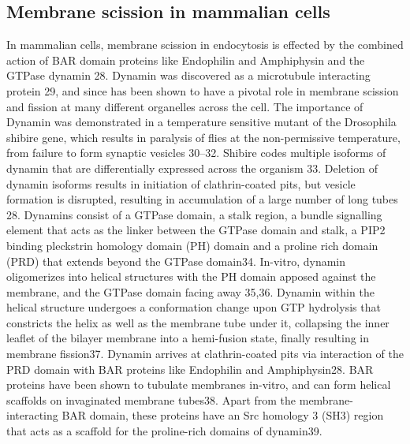 	\subsection{Membrane scission in mammalian cells}
In mammalian cells, membrane scission in endocytosis is effected by the combined action of BAR domain proteins like Endophilin and Amphiphysin and the GTPase dynamin 28.  Dynamin was discovered as a microtubule interacting protein 29, and since has been shown to have a pivotal role in membrane scission and fission at many different organelles across the cell. The importance of Dynamin was demonstrated in a temperature sensitive mutant of the Drosophila shibire gene, which results in paralysis of flies at the non-permissive temperature, from failure to form synaptic vesicles 30–32. Shibire codes multiple isoforms of dynamin that are differentially expressed across the organism 33. Deletion of dynamin isoforms results in initiation of clathrin-coated pits, but vesicle formation is disrupted, resulting in accumulation of a large number of long tubes 28. 
Dynamins consist of a GTPase domain, a stalk region, a bundle signalling element that acts as the linker between the GTPase domain and stalk, a PIP2 binding pleckstrin homology domain (PH) domain and a proline rich domain (PRD) that extends beyond the GTPase domain34. In-vitro, dynamin oligomerizes into helical structures with the PH domain apposed against the membrane, and the GTPase domain facing away 35,36. Dynamin within the helical structure undergoes a conformation change upon GTP hydrolysis that constricts the helix as well as the membrane tube under it, collapsing the inner leaflet of the bilayer membrane into a hemi-fusion state, finally resulting in membrane fission37.
Dynamin arrives at clathrin-coated pits via interaction of the PRD domain with BAR proteins like Endophilin and Amphiphysin28. BAR proteins have been shown to tubulate membranes in-vitro, and can form helical scaffolds on invaginated membrane tubes38. Apart from the membrane-interacting BAR domain, these proteins have an Src homology 3 (SH3) region that acts as a scaffold for the proline-rich domains of dynamin39. 


